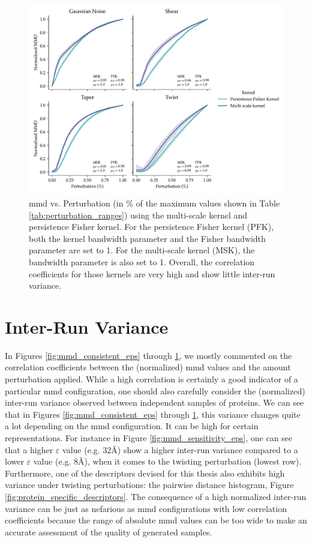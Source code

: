 \begin{figure}
  \centering
  \includegraphics[width=\textwidth]{./figures/results/res_6.pdf}
  \caption[\acrshort{mmd} using topological kernels.]{\acrshort{mmd} vs.
Perturbation (in \% of the maximum values shown in Table
\ref{tab:perturbation_ranges}) using the multi-scale kernel and persistence
Fisher kernel. For the persistence Fisher kernel (PFK), both the kernel
bandwidth parameter and the Fisher bandwidth parameter are set to 1. For the
multi-scale kernel (MSK), the bandwidth parameter is also set to 1. Overall, the
correlation coefficients for those kernels are very high and show little
inter-run variance.}
  \label{fig:tda_kernels}
\end{figure}


\section{Inter-Run Variance}

In Figures \ref{fig:mmd_consistent_eps} through \ref{fig:tda_kernels}, we mostly
commented on the correlation coefficients between the (normalized) \acrshort{mmd} values
and the amount perturbation applied. While a high correlation is certainly a
good indicator of a particular \acrshort{mmd} configuration, one should also carefully
consider the (normalized) inter-run variance observed between independent
samples of proteins. We can see that in Figures \ref{fig:mmd_consistent_eps}
through \ref{fig:tda_kernels}, this variance changes quite a lot depending on
the \acrshort{mmd} configuration. It can be high for certain representations.
For instance in Figure \ref{fig:mmd_sensitivity_eps}, one can see that a higher
$\varepsilon$ value (e.g. 32\si{\angstrom}) show a higher inter-run variance
compared to a lower $\varepsilon$ value (e.g. 8\si{\angstrom}), when
it comes to the twisting perturbation (lowest row). Furthermore, one of the
descriptors devised for this thesis also exhibits high variance under twisting
perturbations: the pairwise distance histogram, Figure
\ref{fig:protein_specific_descriptors}. The consequence of a high normalized
inter-run variance can be just as nefarious as \acrshort{mmd} configurations with low
correlation coefficients because the range of absolute \acrshort{mmd} values can be too wide
to make an accurate assessment of the quality of generated samples.


